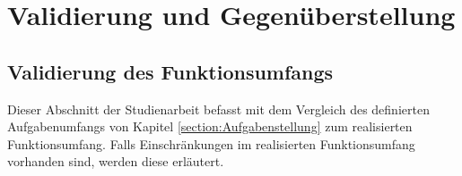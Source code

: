 
\chapter{Validierung und Gegenüberstellung}

\section{Validierung des Funktionsumfangs}

Dieser Abschnitt der Studienarbeit befasst mit dem Vergleich des definierten Aufgabenumfangs von Kapitel \ref{section:Aufgabenstellung} zum realisierten Funktionsumfang. Falls Einschränkungen im realisierten Funktionsumfang vorhanden sind, werden diese erläutert.

